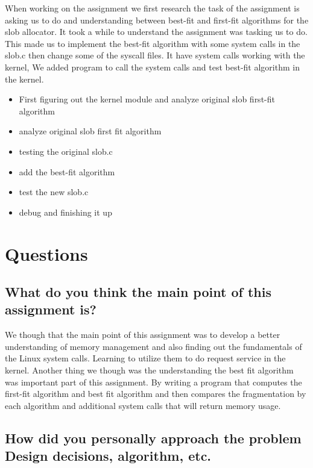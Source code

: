 \documentclass[onecolumn, draftclsnofoot, 10pt, titlepage, compsoc]{IEEEtran}
\begin{document}
When working on the assignment we first research the task of the assignment is asking us to do and understanding between best-fit and first-fit algorithms for the slob allocator. It took a while to understand the assignment was tasking us to do. This made us to implement the best-fit algorithm with some system calls in the slob.c then change some of the syscall files. It have system calls working with the kernel, We added program to call the system calls and test best-fit algorithm in the kernel. 
\begin{itemize}

\item First figuring out the kernel module and analyze original slob first-fit algorithm
\item analyze original slob first fit algorithm
\item testing the original slob.c
\item add the best-fit algorithm
\item test the new slob.c
\item debug and finishing it up

\end{itemize}

\section{Questions}

\subsection{What do you think the main point of this assignment is?}

We though that the main point of this assignment was to develop a better understanding of memory management and also finding out the fundamentals of the Linux system calls. Learning to utilize them to do request service in the kernel. Another thing we though was the understanding the best fit algorithm was important part of this assignment. By writing a program that computes the first-fit algorithm and best fit algorithm and then compares the fragmentation by each algorithm and additional system calls that will return memory usage.\\

\subsection{How did you personally approach the problem Design decisions, algorithm, etc.}
\end{document}
